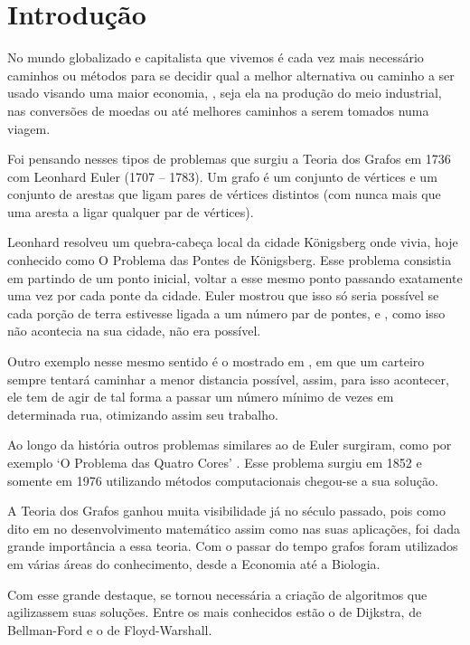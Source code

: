 \chapter*[Introdução]{Introdução}

No mundo globalizado e capitalista que vivemos é cada vez mais necessário caminhos ou métodos para se decidir qual a melhor alternativa ou caminho a ser usado visando uma maior economia, , seja ela na produção do meio industrial, nas conversões de moedas ou até melhores caminhos a serem tomados numa viagem. 

Foi pensando nesses tipos de problemas que surgiu a Teoria dos Grafos em 1736 com Leonhard Euler (1707 – 1783). Um grafo é um conjunto de vértices e um conjunto de arestas que ligam pares de vértices distintos (com nunca mais que uma aresta a ligar qualquer par de vértices).

  Leonhard resolveu um quebra-cabeça local da cidade Königsberg onde vivia, hoje conhecido como O Problema das Pontes de Königsberg. Esse problema consistia em partindo de um ponto inicial, voltar a esse mesmo ponto passando exatamente uma vez por cada ponte da cidade. Euler mostrou que isso só seria possível se cada porção de terra estivesse ligada a um número par de pontes, e , como isso não acontecia na sua cidade, não era possível.
  
    Outro exemplo nesse mesmo sentido é o mostrado em \cite{costalonga2012grafos}, em que um carteiro sempre tentará caminhar a menor distancia possível, assim, para isso acontecer, ele tem de agir de tal forma a passar um número mínimo de vezes em determinada rua, otimizando assim seu trabalho.
  
   Ao longo da história outros problemas similares ao de Euler surgiram, como por exemplo ‘O Problema das Quatro Cores’ . Esse problema surgiu em 1852 e somente em 1976 utilizando métodos computacionais chegou-se a sua solução. 

A Teoria dos Grafos ganhou muita visibilidade já no século passado, pois como dito em \cite{da2011teoria} no desenvolvimento matemático  assim como nas suas aplicações, foi dada grande importância a essa teoria. Com o passar do tempo grafos foram utilizados em várias áreas do conhecimento, desde a Economia até a Biologia. 

Com esse grande destaque, se tornou necessária a criação de algoritmos que agilizassem suas soluções. Entre os mais conhecidos estão o de Dijkstra, de Bellman-Ford e o de Floyd-Warshall.
